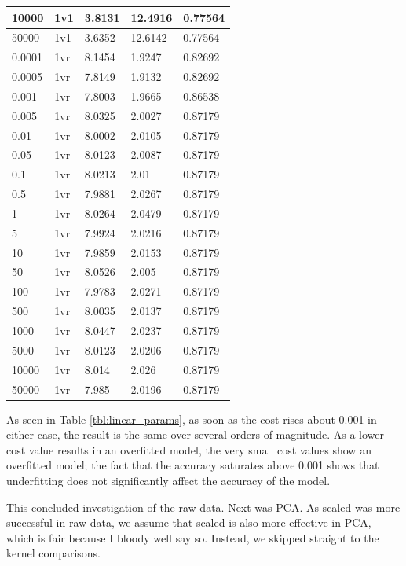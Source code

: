 \documentclass[a4paper, 10pt, conference]{ieeeconf}
\begin{document}
\begin{table}
\begin{tabular}{lllll}
10000 & 1v1 & 3.8131 & 12.4916 & 0.77564\\ \hline
50000 & 1v1 & 3.6352 & 12.6142 & 0.77564\\ \hline
0.0001 & 1vr & 8.1454 & 1.9247 & 0.82692\\ \hline
0.0005 & 1vr & 7.8149 & 1.9132 & 0.82692\\ \hline
0.001 & 1vr & 7.8003 & 1.9665 & 0.86538\\ \hline
0.005 & 1vr & 8.0325 & 2.0027 & 0.87179\\ \hline
0.01 & 1vr & 8.0002 & 2.0105 & 0.87179\\ \hline
0.05 & 1vr & 8.0123 & 2.0087 & 0.87179\\ \hline
0.1 & 1vr & 8.0213 & 2.01 & 0.87179\\ \hline
0.5 & 1vr & 7.9881 & 2.0267 & 0.87179\\ \hline
1 & 1vr & 8.0264 & 2.0479 & 0.87179\\ \hline
5 & 1vr & 7.9924 & 2.0216 & 0.87179\\ \hline
10 & 1vr & 7.9859 & 2.0153 & 0.87179\\ \hline
50 & 1vr & 8.0526 & 2.005 & 0.87179\\ \hline
100 & 1vr & 7.9783 & 2.0271 & 0.87179\\ \hline
500 & 1vr & 8.0035 & 2.0137 & 0.87179\\ \hline
1000 & 1vr & 8.0447 & 2.0237 & 0.87179\\ \hline
5000 & 1vr & 8.0123 & 2.0206 & 0.87179\\ \hline
10000 & 1vr  & 8.014 & 2.026 & 0.87179\\ \hline
50000 & 1vr  & 7.985 & 2.0196 & 0.87179\\ \hline
\end{tabular}
\end{table}

As seen in Table \ref{tbl:linear_params}, as soon as the cost rises about 0.001 in either case, the result is the same over several orders of magnitude. As a lower cost value results in an overfitted model, the very small cost values show an overfitted model; the fact that the accuracy saturates above 0.001 shows that underfitting does not significantly affect the accuracy of the model.

This concluded investigation of the raw data. Next was PCA. As scaled was more successful in raw data, we assume that scaled is also more effective in PCA, which is fair because I bloody well say so. Instead, we skipped straight to the kernel comparisons.
\end{document}
